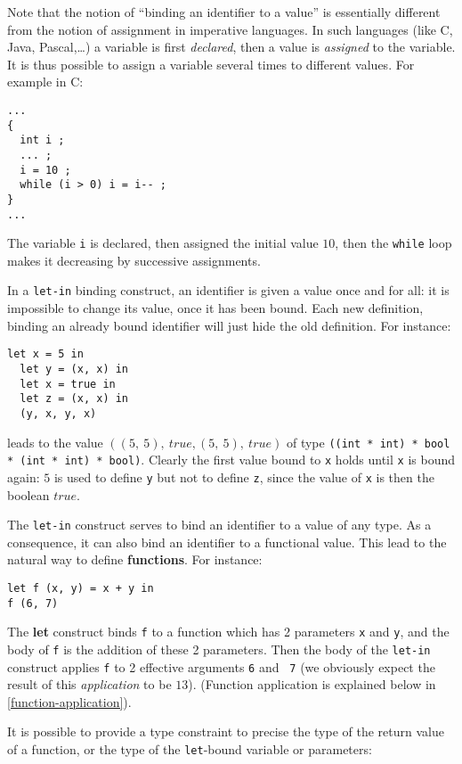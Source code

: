 \medskip
{}
Note that the notion of ``binding an identifier to a value'' is
essentially different from the
notion of assignment in imperative languages. In such languages (like
C, Java, Pascal,\ldots) a variable is first {\em declared}, then a value is
{\em assigned} to the variable. It is thus possible to assign a variable
several times to different values. For example in C:
{\scriptsize
\begin{lstlisting}
...
{
  int i ;
  ... ;
  i = 10 ;
  while (i > 0) i = i-- ;
}
...
\end{lstlisting}
}
The variable {\tt i} is declared, then assigned the initial value
$10$, then the {\tt while} loop makes it decreasing by successive
assignments.

In a {\tt let-in} binding construct, an identifier is given a value
once and for all: it is impossible to change its  value, once it
has been bound.
Each new definition, binding an already bound identifier will just hide the
old definition. For instance:
{\scriptsize
\begin{lstlisting}
let x = 5 in
  let y = (x, x) in
  let x = true in
  let z = (x, x) in
  (y, x, y, x)
\end{lstlisting}
}
leads to the value $((5,\ 5),\ true, (5,\ 5),\ true)$
of type {\tt ((int * int) * bool * (int * int) * bool)}. Clearly the
first value bound to {\tt x}  holds until {\tt x}
is bound again: $5$ is used to define {\tt y} but not to define
{\tt z}, since the value of {\tt x} is then the boolean $true$.

\medskip

The {\tt let-in} construct serves to bind an identifier to a value of
any type.  As a consequence, it can also bind an identifier to a
functional value.  This lead to the natural way to define {\bf
  functions}. For instance:

 {\scriptsize
\begin{lstlisting}
let f (x, y) = x + y in
f (6, 7)
\end{lstlisting}
}

The {\bf let} construct binds {\tt f} to a function which has 2
parameters {\tt x} and {\tt y}, and the body of {\tt f} is the
addition of these 2 parameters. Then the body of the {\tt let-in}
construct applies {\tt f} to 2 effective arguments {\tt 6} and {\tt
  7} (we obviously expect the result of this {\em application} to be
$13$).  (Function application is explained below in
\ref{function-application}).

It is possible to provide a type constraint to precise the type of the
return value of a function, or the type of the {\tt let}-bound
variable or parameters:


